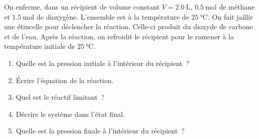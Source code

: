 On enferme, dans un récipient de volume constant $V=\qty{2.0}{\L}$,
$\qty{0.5}{\mol}$ de méthane  et $\qty{1.5}{\mol}$ de dioxygène.
L'ensemble est à la température de $\qty{25}{\degreeCelsius}$. On fait jaillir
une étincelle pour déclencher la réaction. Celle-ci produit du dioxyde de
carbone et de l'eau. Après la réaction, on refroidit le récipient pour le
ramener à la température initiale de $\qty{25}{\degreeCelsius}$.
\begin{enumerate}
    \item Quelle est la pression initiale à l'intérieur du récipient~?
    \item Écrire l'équation de la réaction.
    \item Quel est le réactif limitant~?
    \item Décrire le système dans l'état final.
    \item Quelle est la pression finale à l'intérieur du récipient~?
\end{enumerate}

